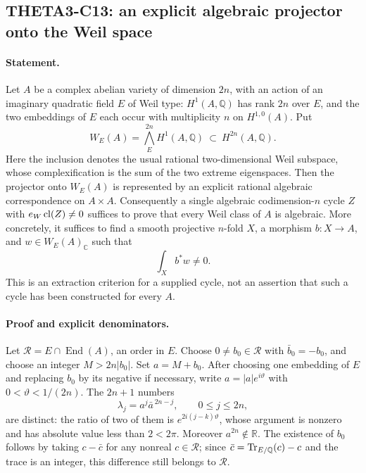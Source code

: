 \documentclass[11pt]{article}
\newcommand{\Q}{\mathbb Q}\newcommand{\C}{\mathbb C}\newcommand{\Z}{\mathbb Z}\newcommand{\R}{\mathbb R}\newcommand{\A}{\mathbb A}\newcommand{\OO}{\mathcal O}
\theoremstyle{definition}\newtheorem{definition}[theorem]{Definition}\newtheorem{remark}[theorem]{Remark}
\begin{document}
\subsection{THETA3-C13: an explicit algebraic projector onto the Weil space}\label{C13}

\paragraph{Statement.}
Let $A$ be a complex abelian variety of dimension $2n$, with an action of
an imaginary quadratic field $E$ of Weil type: $H^1(A,\Q)$ has rank
$2n$ over $E$, and the two embeddings of $E$ each occur with multiplicity
$n$ on $H^{1,0}(A)$. Put
\[
 W_E(A)=\bigwedge_E^{2n}H^1(A,\Q)\ \subset\ H^{2n}(A,\Q).
\]
Here the inclusion denotes the usual rational two-dimensional Weil
subspace, whose complexification is the sum of the two extreme
eigenspaces. Then the projector onto $W_E(A)$ is represented by an
explicit rational algebraic correspondence on $A\times A$.
Consequently a single algebraic codimension-$n$ cycle $Z$ with
$e_W\operatorname{cl}(Z)\ne0$ suffices to prove that every Weil class of $A$ is
algebraic. More concretely, it suffices to find a smooth projective
$n$-fold $X$, a morphism $b:X\to A$, and $w\in W_E(A)_{\C}$ such that
\begin{equation}\label{C13-period}
 \int_X b^*w\ne0.
\end{equation}
This is an extraction criterion for a supplied cycle, not an assertion
that such a cycle has been constructed for every $A$.

\paragraph{Proof and explicit denominators.}
Let $\mathcal R=E\cap\operatorname{End}(A)$, an order in $E$.
Choose $0\ne b_0\in\mathcal R$ with $\bar b_0=-b_0$, and choose an
integer $M>2n|b_0|$. Set $a=M+b_0$. After choosing one embedding of
$E$ and replacing $b_0$ by its negative if necessary, write
$a=|a|e^{i\vartheta}$ with $0<\vartheta<1/(2n)$.
The $2n+1$ numbers
\[
 \lambda_j=a^j\bar a^{\,2n-j},\qquad 0\le j\le2n,
\]
are distinct: the ratio of two of them is
$e^{2i(j-k)\vartheta}$, whose argument is nonzero and has absolute
value less than $2<2\pi$. Moreover $a^{2n}\notin\R$.
The existence of $b_0$ follows by taking $c-\bar c$ for any nonreal
$c\in\mathcal R$; since $\bar c=\Tr_{E/\Q}(c)-c$ and the trace is an
integer, this difference still belongs to $\mathcal R$.
\end{document}
